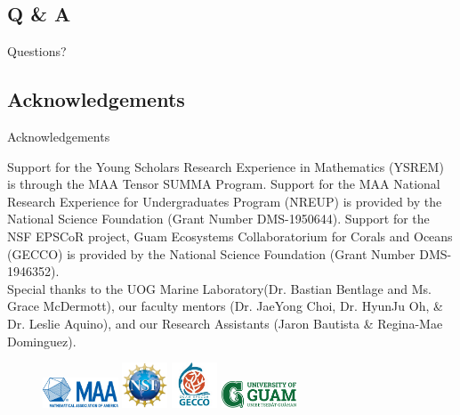 \documentclass{beamer}
\begin{document}
\subsection{Q \& A}
\begin{frame}
    \Huge{Questions?}
\end{frame}

\subsection{Acknowledgements}
\begin{frame}{Acknowledgements}
    \begin{center}
        Support for the Young Scholars Research Experience in Mathematics (YSREM)  is through the MAA Tensor SUMMA Program. Support for the MAA National Research Experience for Undergraduates Program (NREUP) is provided by the National Science Foundation (Grant Number DMS-1950644). Support for the NSF EPSCoR project, Guam Ecosystems Collaboratorium for Corals and Oceans (GECCO) is provided by the National Science Foundation (Grant Number DMS-1946352). \\
    \vspace{.2cm}
    \small{Special thanks to the UOG Marine Laboratory(Dr. Bastian Bentlage and Ms. Grace McDermott), our faculty mentors (Dr. JaeYong Choi, Dr. HyunJu Oh, \& Dr. Leslie Aquino), and our Research Assistants (Jaron Bautista \& Regina-Mae Dominguez).}
    
    \begin{figure}
        \includegraphics[width = 0.20\textwidth]{Figures/MAA_logo_PMS286.jpg}
        \label{MAA}
        \includegraphics[width = 0.12\textwidth]{Figures/NSF_4-Color_bitmap_Logo.png}
        \label{NSF}
        \includegraphics[width = 0.12\textwidth]{Figures/epscor.jpeg}
        \label{epscor}
        \includegraphics[width = 0.20\textwidth]{Figures/UOG-horizontal.png}
        \label{uog}
    \end{figure}
    \end{center}
\end{frame}
\end{document}
